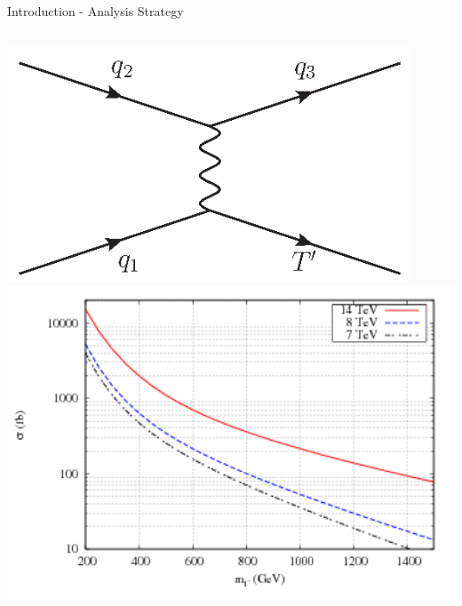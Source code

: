 \begin{frame}{Introduction - Analysis Strategy}
\begin{columns}
\begin{column}{.50\textwidth}
\begin{center}
\includegraphics[width=0.9\textwidth]{../figs/Tchannel_T_single.jpg}\\
\includegraphics[width=1.0\textwidth]{../figs/pheno_prod_single_tp.png}
\end{center}
\end{column}
\end{columns}

\end{frame}

